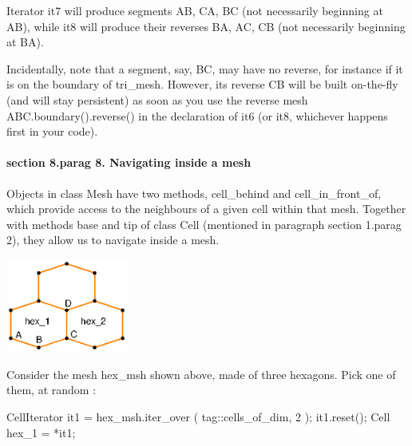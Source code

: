Iterator {\codett it7} will produce segments {\codett AB}, {\codett CA}, {\codett BC}
(not necessarily beginning at {\codett AB}), while {\codett it8} will produce their reverses
{\codett BA}, {\codett AC}, {\codett CB} (not necessarily beginning at {\codett BA}).

Incidentally, note that a segment, say, {\codett BC}, may have no reverse,
for instance if it is on the boundary of {\codett tri\_mesh}.
However, its reverse {\codett CB} will be built on-the-fly (and will stay persistent)
as soon as you use the reverse mesh {\codett ABC.boundary().reverse()} in the declaration of
{\codett it6} (or {\codett it8}, whichever happens first in your code).


\paragraph{\numb section 8.\numb parag 8. Navigating inside a mesh}

Objects in class {\codett Mesh} have two methods, {\codett cell\_behind} and
{\codett cell\_in\_front\_of},
which provide access to the neighbours of a given cell within that mesh.
Together with methods {\codett base} and {\codett tip} of class {\codett Cell}
(mentioned in paragraph \numb section 1.\numb parag 2), they allow us to navigate inside
a mesh.

{ 
\centerline{\includegraphics[width=4cm]{malha-hex.eps}} }
\medskip

Consider the mesh {\codett hex\_msh} shown above, made of three hexagons.
Pick one of them, at random :

\verbatim
   CellIterator it1 = hex_msh.iter_over ( tag::cells_of_dim, 2 );
   it1.reset();
   Cell hex_1 = *it1;
\endverbatim

